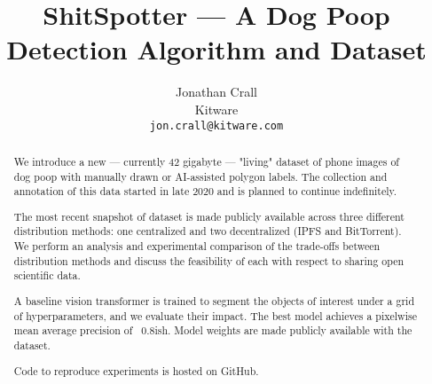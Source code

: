 \documentclass[10pt,twocolumn,letterpaper]{article}
\begin{document}
\title{ShitSpotter --- A Dog Poop Detection Algorithm and Dataset}

\author{Jonathan Crall\\
Kitware\\
{\tt\small jon.crall@kitware.com}
}
\maketitle

\begin{comment}
    cd $HOME/code/shitspotter
    python -m shitspotter.cli.coco_annotation_stats $HOME/data/dvc-repos/shitspotter_dvc/data.kwcoco.json \
        --dst_fpath $HOME/code/shitspotter/coco_annot_stats/stats.json \
        --dst_dpath $HOME/code/shitspotter/coco_annot_stats
\end{comment}

\begin{abstract}

We introduce a new --- currently 42 gigabyte --- "living" dataset of phone images of
dog poop with manually drawn or AI-assisted polygon labels.
The collection and annotation of this data started in late 2020 and is planned
to continue indefinitely.

The most recent snapshot of dataset is made publicly available across three
different distribution methods: one centralized and two decentralized (IPFS and
BitTorrent).
We perform an analysis and experimental comparison of the trade-offs between
distribution methods and discuss the feasibility of each with respect to
sharing open scientific data.

A baseline vision transformer is trained to segment the objects of interest
under a grid of hyperparameters, and we evaluate their impact. The best model
achieves a pixelwise mean average precision of ~0.8ish. 
Model weights are made publicly available with the dataset. 

Code to reproduce experiments is hosted on GitHub.


\end{abstract}
\end{document}
